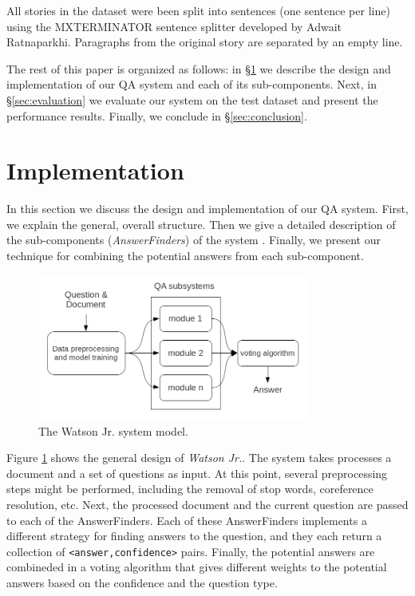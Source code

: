 \documentclass{acm_proc_article-sp}
\newcommand{\name}{\emph{Watson Jr.}}
\begin{document}
All stories in the dataset were been split into sentences (one
sentence per line) using the MXTERMINATOR sentence splitter developed
by Adwait Ratnaparkhi.  Paragraphs from the original story are
separated by an empty line. 

The rest of this paper is organized as follows: in
\S\ref{sec:implementation} we describe the design and implementation
of our QA system and each of its sub-components. Next, in
\S\ref{sec:evaluation} we evaluate our system on the test dataset and
present the performance results. Finally, we conclude in
\S\ref{sec:conclusion}.


\section{Implementation}
\label{sec:implementation}

In this section we discuss the design and implementation of our QA
system. First, we explain the general, overall structure. Then we give
a detailed description of the sub-components (\emph{AnswerFinders}) of
the system . Finally, we present our technique for combining the
potential answers from each sub-component.

\begin{figure} 
	\centering
	\includegraphics[width=0.8\textwidth]{model.png}
	\caption{The Watson Jr. system model.}
	\label{fig:model}
\end{figure}

Figure \ref{fig:model} shows the general design of \name.
The system takes processes a document and a set of questions as input.
At this point, several preprocessing steps might be performed,
including the removal of stop words, coreference resolution, etc.
Next, the processed document and the current question are passed to
each of the AnswerFinders. Each of these AnswerFinders implements a
different strategy for finding answers to the question, and they
each return a collection of \texttt{<answer,confidence>} pairs.
Finally, the potential answers are combineded in a voting algorithm
that gives different weights to the potential answers based on the
confidence and the question type.
\end{document}
